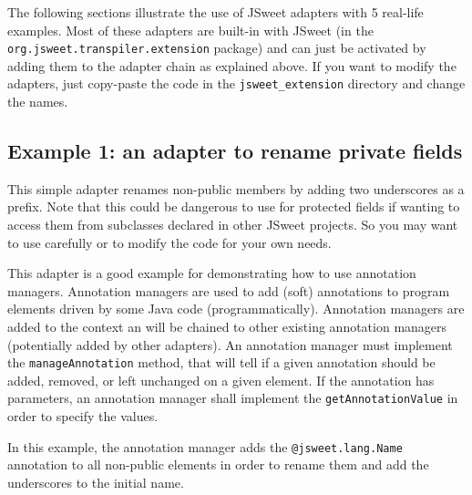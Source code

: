 \documentclass[a4paper]{report}
\begin{document}
The following sections illustrate the use of JSweet adapters with 5 real-life examples. Most of these adapters are built-in with JSweet (in the \texttt{org\-.jsweet\-.transpiler\-.extension} package) and can just be activated by adding them to the adapter chain as explained above. If you want to modify the adapters, just copy-paste the code in the \texttt{jsweet\_extension} directory and change the names.

\subsection{Example 1: an adapter to rename private fields}

This simple adapter renames non-public members by adding two underscores as a prefix.
Note that this could be dangerous to use for protected fields if wanting to access them from subclasses declared in other JSweet projects. So you may want to use carefully or to modify the code for your own needs.

This adapter is a good example for demonstrating how to use annotation managers. Annotation managers are used to add (soft) annotations to program elements driven by some Java code (programmatically). Annotation managers are added to the context an will be chained to other existing annotation managers (potentially added by other adapters). An annotation manager must implement the  \texttt{manageAnnotation} method, that will tell if a given annotation should be added, removed, or left unchanged on a given element. If the annotation has parameters, an annotation manager shall implement the \texttt{getAnnotationValue} in order to specify the values.

In this example, the annotation manager adds the \texttt{@jsweet.lang.Name} annotation to all non-public elements in order to rename them and add the underscores to the initial name.
\end{document}
